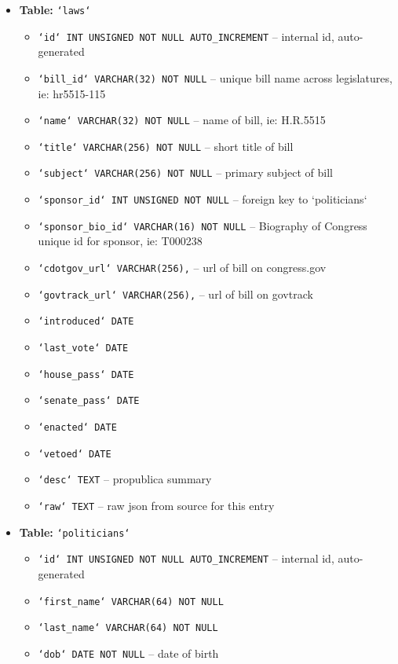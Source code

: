 \documentclass[12pt]{article}
\newcommand{\code}[1]{\texttt{#1}}
\begin{document}
\begin{itemize}[font=\bfseries,leftmargin=0px,label=]
	\item \textbf{Table:} \code{`laws`}
	\begin{itemize}
		\item \code{`id` INT UNSIGNED NOT NULL AUTO\_INCREMENT}	-- internal id, auto-generated
		\item \code{`bill\_id` VARCHAR(32) NOT NULL}			-- unique bill name across legislatures, ie: hr5515-115
		\item \code{`name` VARCHAR(32) NOT NULL}				-- name of bill, ie: H.R.5515
		\item \code{`title` VARCHAR(256) NOT NULL}				-- short title of bill
		\item \code{`subject` VARCHAR(256) NOT NULL}			-- primary subject of bill
		\item \code{`sponsor\_id` INT UNSIGNED NOT NULL}		-- foreign key to `politicians`
		\item \code{`sponsor\_bio\_id` VARCHAR(16) NOT NULL}	-- Biography of Congress unique id for sponsor, ie: T000238
		\item \code{`cdotgov\_url` VARCHAR(256),}				-- url of bill on congress.gov
		\item \code{`govtrack\_url` VARCHAR(256),}				-- url of bill on govtrack
		\item \code{`introduced` DATE}
		\item \code{`last\_vote` DATE}
		\item \code{`house\_pass` DATE}
		\item \code{`senate\_pass` DATE}
		\item \code{`enacted` DATE}
		\item \code{`vetoed` DATE}
		\item \code{`desc` TEXT}								-- propublica summary
		\item \code{`raw` TEXT}									-- raw json from source for this entry
	\end{itemize}
	\item \textbf{Table:} \code{`politicians`}
	\begin{itemize}
		\item \code{`id` INT UNSIGNED NOT NULL AUTO\_INCREMENT}	-- internal id, auto-generated
		\item \code{`first\_name` VARCHAR(64) NOT NULL}
		\item \code{`last\_name` VARCHAR(64) NOT NULL}
		\item \code{`dob` DATE NOT NULL}						-- date of birth

\end{itemize}
\end{itemize}
\end{document}

